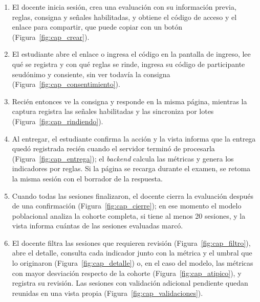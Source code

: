 \begin{enumerate}
    \item El docente inicia sesión, crea una evaluación con su información previa, reglas, consigna y señales habilitadas, y obtiene el código de acceso y el enlace para compartir, que puede copiar con un botón (Figura~\ref{fig:cap_crear}).
    \item El estudiante abre el enlace o ingresa el código en la pantalla de ingreso, lee qué se registra y con qué reglas se rinde, ingresa su código de participante seudónimo y consiente, sin ver todavía la consigna (Figura~\ref{fig:cap_consentimiento}).
    \item Recién entonces ve la consigna y responde en la misma página, mientras la captura registra las señales habilitadas y las sincroniza por lotes (Figura~\ref{fig:cap_rindiendo}).
    \item Al entregar, el estudiante confirma la acción y la vista informa que la entrega quedó registrada recién cuando el servidor terminó de procesarla (Figura~\ref{fig:cap_entrega}); el \textit{backend} calcula las métricas y genera los indicadores por reglas. Si la página se recarga durante el examen, se retoma la misma sesión con el borrador de la respuesta.
    \item Cuando todas las sesiones finalizaron, el docente cierra la evaluación después de una confirmación (Figura~\ref{fig:cap_cierre}); en ese momento el modelo poblacional analiza la cohorte completa, si tiene al menos 20 sesiones, y la vista informa cuántas de las sesiones evaluadas marcó.
    \item El docente filtra las sesiones que requieren revisión (Figura~\ref{fig:cap_filtro}), abre el detalle, consulta cada indicador junto con la métrica y el umbral que lo originaron (Figura~\ref{fig:cap_detalle}) o, en el caso del modelo, las métricas con mayor desviación respecto de la cohorte (Figura~\ref{fig:cap_atipico}), y registra su revisión. Las sesiones con validación adicional pendiente quedan reunidas en una vista propia (Figura~\ref{fig:cap_validaciones}).
\end{enumerate}



